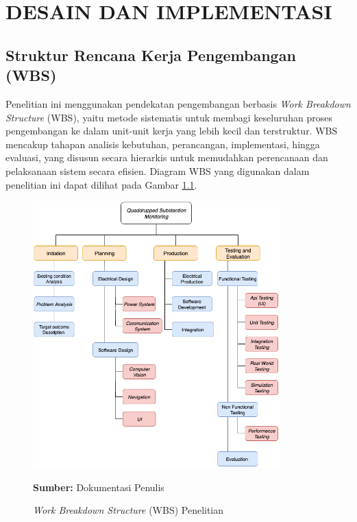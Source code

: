 \chapter{DESAIN DAN IMPLEMENTASI}
\label{chap:desainimplementasi}


\section{Struktur Rencana Kerja Pengembangan (WBS)}
\sloppy
Penelitian ini menggunakan pendekatan pengembangan berbasis \emph{Work Breakdown Structure} (WBS), yaitu metode sistematis untuk membagi keseluruhan proses pengembangan ke dalam unit-unit kerja yang lebih kecil dan terstruktur. WBS mencakup tahapan analisis kebutuhan, perancangan, implementasi, hingga evaluasi, yang disusun secara hierarkis untuk memudahkan perencanaan dan pelaksanaan sistem secara efisien. Diagram WBS yang digunakan dalam penelitian ini dapat dilihat pada Gambar \ref{fig:wbs}.

\begin{figure}[H]
  \centering
  \includegraphics[width=0.85\textwidth]{gambar/bab3/wbs-ta.png}
  \caption{\emph{Work Breakdown Structure} (WBS) Penelitian}
  \label{fig:wbs}
  \footnotesize{\textbf{Sumber:} Dokumentasi Penulis}
\end{figure}

